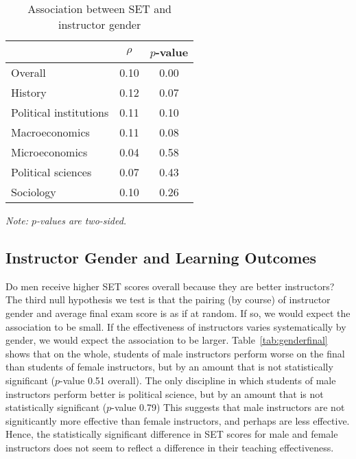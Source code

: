 \documentclass[12pt]{article}
\begin{document}
\begin{table}[htbp]
  \centering
  \footnotesize 
  \caption{Association between SET and instructor gender}
    \begin{tabular}{lcc}
    \toprule 
                          & $\rho$  & $p$-value     \\
   \midrule
    Overall &                 0.10       & 0.00     \\
    History &                 0.12       & 0.07     \\
    Political institutions &  0.11       & 0.10     \\
    Macroeconomics &          0.11       & 0.08     \\
    Microeconomics &          0.04       & 0.58     \\
    Political sciences &      0.07       & 0.43     \\
    Sociology &               0.10       & 0.26     \\
    \bottomrule
    \end{tabular}%
 \label{tab:instructorgender}%
  
  \textit{Note: $p$-values are two-sided.}
\end{table}%
\normalsize

\subsection{Instructor Gender and Learning Outcomes}
Do men receive higher SET scores overall because they are better instructors? 
The third null hypothesis we test is that the pairing (by course) of instructor gender and
average final exam score is as if at random.
If so, we would expect the association to be small.
If the effectiveness of instructors varies systematically by gender,
we would expect the association to be larger. 
Table~\ref{tab:genderfinal} shows that on the whole, students of male instructors
perform worse on the final than students of female instructors, but by an amount that is
not statistically significant ($p$-value 0.51 overall).
The only discipline in which students of male instructors perform better is political science,
but by an amount that is not statistically significant ($p$-value 0.79)
This suggests that male instructors are not signiticantly more effective than female instructors, 
and perhaps are less effective. 
Hence, the statistically significant difference in SET scores for male and female instructors
does not seem to reflect a difference in their teaching effectiveness.
\end{document}
